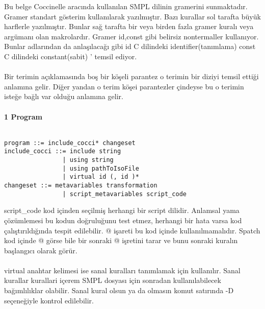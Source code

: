 \documentclass[a4paper,20pt, right=2cm]{article}
\begin{document}
        
Bu belge Coccinelle aracında kullanılan SMPL dilinin gramerini sunmaktadır. Gramer standart gösterim kullanılarak yazılmıştır. Bazı kurallar sol tarafta büyük harflerle yazılmıştır. Bunlar sağ tarafta bir veya birden fazla gramer kuralı veya argümanı olan makrolardır. Gramer id,const gibi belirsiz nontermaller kullanıyor. Bunlar adlarından da anlaşılacağı gibi id C dilindeki identifier(tanımlama) const C dilindeki constant(sabit) ' temsil ediyor.\\
\\
Bir terimin açıklamasında boş bir köşeli parantez o terimin bir diziyi temsil ettiği anlamına gelir. Diğer yandan o terim köşei parantezler çindeyse bu o terimin isteğe bağlı var olduğu anlamına gelir.\\
\\
\textbf{1 Program}\\
\\
\begin{lstlisting}
program ::= include_cocci* changeset
include_cocci ::= include string
                | using string
                | using pathToIsoFile
                | virtual id (, id )*
changeset ::= metavariables transformation
                | script_metavariables script_code
\end{lstlisting}
script\_code kod içinden seçilmiş herhangi bir script dilidir. Anlamsal yama çözümlemesi bu kodun doğruluğunu test etmez, herhangi bir hata varsa kod çalıştırıldığında tespit edilebilir. @ işareti bu kod içinde kullanılmamalıdır. Spatch kod içinde @ görse bile bir sonraki @ işretini tarar ve bunu sonraki kuralın başlangıcı olarak görür.\\
\\
virtual anahtar kelimesi ise sanal kuralları tanımlamak için kullanılır. Sanal kurallar kurallari içerem SMPL dosyası için sonradan kullanılabilecek bağımlılıklar olabilir. Sanal kural olsun ya da olmasın  komut satırında -D seçeneğiyle kontrol edilebilir.
\end{document}
